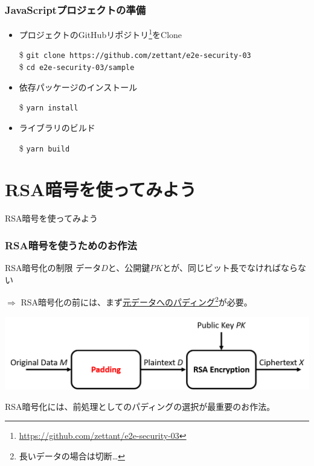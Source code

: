 \documentclass[12pt,dvipdfmx]{beamer}
\begin{document}
\begin{frame}
\frametitle{JavaScriptプロジェクトの準備}
\begin{itemize}
\item プロジェクトのGitHubリポジトリ\footnote[frame]{\url{https://github.com/zettant/e2e-security-03}}をClone\\
\begin{exampleblock}{}
\footnotesize
\$ \texttt{git clone https://github.com/zettant/e2e-security-03}\\
\$ \texttt{cd e2e-security-03/sample}
\end{exampleblock}
\item 依存パッケージのインストール
\begin{exampleblock}{}
\$ \texttt{yarn install}
\end{exampleblock}
\item ライブラリのビルド
\begin{exampleblock}{}
\$ \texttt{yarn build}
\end{exampleblock}
\end{itemize}
\end{frame}

\section{RSA暗号を使ってみよう}
\begin{frame}
\centering
{\Large RSA暗号を使ってみよう}
\end{frame}

\begin{frame}
\frametitle{RSA暗号を使うためのお作法}
\begin{block}{\small RSA暗号化の制限}
\alert{データ$D$と、公開鍵$PK$とが、同じビット長でなければならない}
\end{block}
$\Rightarrow$ RSA暗号化の前には、まず\underline{元データへのパディング}\footnote[frame]{\scriptsize 長いデータの場合は切断…}が必要。

\begin{center}
\includegraphics[width=0.9\linewidth]{Figs/rsa-padding.png}\\%
\end{center}
\vspace{2ex}

\alert{RSA暗号化には、前処理としてのパディングの選択が最重要のお作法。}
\end{frame}
\end{document}
